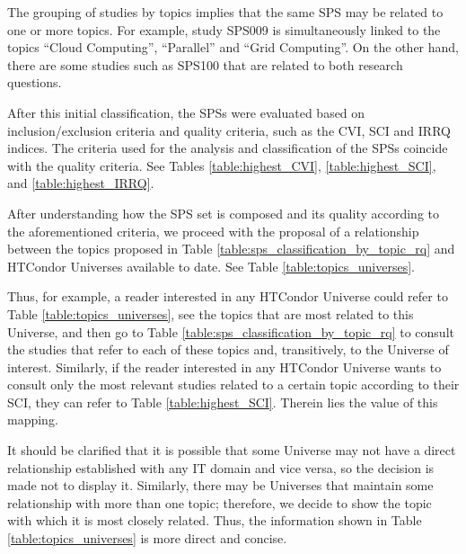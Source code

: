 The grouping of studies by topics implies that the same SPS may be related to one or more topics. For example, study SPS009 is simultaneously linked to the topics ``Cloud Computing'', ``Parallel'' and ``Grid Computing''. On the other hand, there are some studies such as SPS100 that are related to both research questions.

After this initial classification, the SPSs were evaluated based on inclusion/exclusion criteria and quality criteria, such as the CVI, SCI and IRRQ indices. The criteria used for the analysis and classification of the SPSs coincide with the quality criteria. See Tables \ref{table:highest_CVI}, \ref{table:highest_SCI}, and \ref{table:highest_IRRQ}.

After understanding how the SPS set is composed and its quality according to the aforementioned criteria, we proceed with the proposal of a relationship between the topics proposed in Table \ref{table:sps_classification_by_topic_rq} and HTCondor Universes available to date. See Table \ref{table:topics_universes}.

Thus, for example, a reader interested in any HTCondor Universe could refer to Table \ref{table:topics_universes}, see the topics that are most related to this Universe, and then go to Table \ref{table:sps_classification_by_topic_rq} to consult the studies that refer to each of these topics and, transitively, to the Universe of interest. Similarly, if the reader interested in any HTCondor Universe wants to consult only the most relevant studies related to a certain topic according to their SCI, they can refer to Table \ref{table:highest_SCI}. Therein lies the value of this mapping.

It should be clarified that it is possible that some Universe may not have a direct relationship established with any IT domain and vice versa, so the decision is made not to display it. Similarly, there may be Universes that maintain some relationship with more than one topic; therefore, we decide to show the topic with which it is most closely related. Thus, the information shown in Table \ref{table:topics_universes} is more direct and concise.


